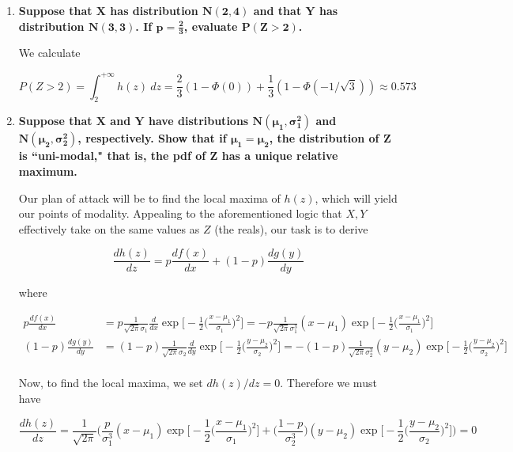 \documentclass[10pt, oneside]{article}   	%
\theoremstyle{definition}
\begin{document}
\begin{enumerate}[label=9.\arabic*]
\begin{enumerate}
	\item  \begin{tcolorbox}[
	  colback=Cerulean!5!white,
	  colframe=Cerulean!75!black]
	\textbf{Suppose that $\bm{X}$ has distribution $\bm{N(2,4)}$ and that $\bm{Y}$ has distribution $\bm{N(3,3)}$. If $\bm{p = \frac{2}{3}}$, evaluate $\bm{P(Z > 2)}$.}
	\end{tcolorbox}
	
	We calculate
	
	\[ P(Z > 2) = \int^{+\infty}_2 h(z) \ dz = \frac{2}{3} (1 - \Phi(0)) + \frac{1}{3} (1 - \Phi(- 1/\sqrt{3})) \approx \boxed{0.573} \]
	
	\item  \begin{tcolorbox}[
	  colback=Cerulean!5!white,
	  colframe=Cerulean!75!black]
	\textbf{Suppose that $\bm{X}$ and $\bm{Y}$ have distributions $\bm{N(\mu_1, \sigma^2_1)}$ and $\bm{N(\mu_2, \sigma^2_2)}$, respectively. Show that if $\bm{\mu_1 = \mu_2}$, the distribution of $\bm{Z}$ is ``uni-modal," that is, the pdf of $\bm{Z}$ has a unique relative maximum.}
	\end{tcolorbox}
	
	Our plan of attack will be to find the local maxima of $h(z)$, which will yield our points of modality. Appealing to the aforementioned logic that $X, Y$ effectively take on the same values as $Z$ (the reals), our task is to derive
	
	\[ \frac{d h(z)}{dz} = p \frac{d f(x)}{dx} + (1-p) \frac{d g(y)}{dy} \]
	
	where
	
	\begin{align*}
	p \frac{d f(x)}{dx} &= p \frac{1}{\sqrt{2\pi} \sigma_1} \frac{d}{dx} \exp \bigg[ -\frac{1}{2} \bigg( \frac{x-\mu_1}{\sigma_1} \bigg)^2 \bigg] = -p \frac{1}{\sqrt{2\pi} \sigma^3_1} (x-\mu_1) \exp  \bigg[ -\frac{1}{2} \bigg( \frac{x-\mu_1}{\sigma_1} \bigg)^2 \bigg] \\
	(1-p) \frac{d g(y)}{dy} &= (1-p) \frac{1}{\sqrt{2\pi} \sigma_2} \frac{d}{dy} \exp \bigg[ -\frac{1}{2} \bigg( \frac{y-\mu_2}{\sigma_2} \bigg)^2 \bigg] = -(1-p) \frac{1}{\sqrt{2\pi} \sigma^3_2} (y-\mu_2) \exp  \bigg[ -\frac{1}{2} \bigg( \frac{y-\mu_2}{\sigma_2} \bigg)^2 \bigg] \\
	\end{align*}
	
	Now, to find the local maxima, we set $dh(z) / dz = 0$. Therefore we must have
	
	\[ \frac{d h(z)}{dz} = \frac{1}{\sqrt{2\pi}} \bigg( \frac{p}{ \sigma^3_1} (x-\mu_1) \exp  \bigg[ -\frac{1}{2} \bigg( \frac{x-\mu_1}{\sigma_1} \bigg)^2 \bigg] + \bigg( \frac{1-p}{ \sigma^3_2} \bigg) (y-\mu_2) \exp  \bigg[ -\frac{1}{2} \bigg( \frac{y-\mu_2}{\sigma_2} \bigg)^2 \bigg] \bigg) = 0 \]
	

\end{enumerate}
\end{enumerate}
\end{document}
